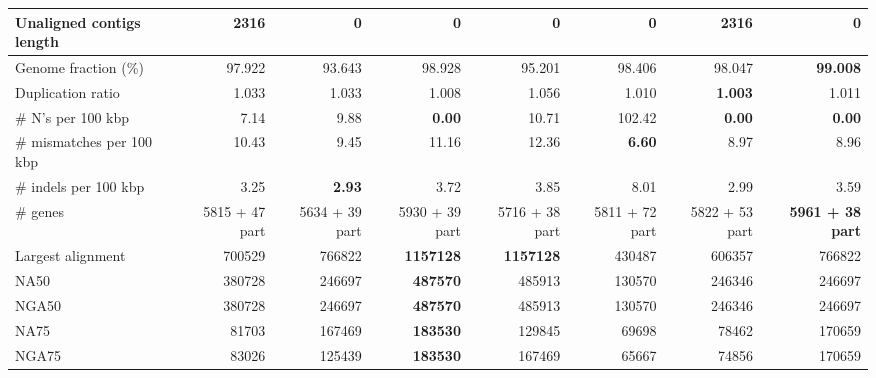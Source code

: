 \documentclass[12pt,a4paper]{article}
\begin{document}
\begin{table}[ht]
\begin{center}
\begin{tabular}{|l*{7}{|r}|}
Unaligned contigs length & 2316 & {\bf 0} & {\bf 0} & {\bf 0} & {\bf 0} & 2316 & {\bf 0} \\ \hline
Genome fraction (\%) & 97.922 & 93.643 & 98.928 & 95.201 & 98.406 & 98.047 & {\bf 99.008} \\ \hline
Duplication ratio & 1.033 & 1.033 & 1.008 & 1.056 & 1.010 & {\bf 1.003} & 1.011 \\ \hline
\# N's per 100 kbp & 7.14 & 9.88 & {\bf 0.00} & 10.71 & 102.42 & {\bf 0.00} & {\bf 0.00} \\ \hline
\# mismatches per 100 kbp & 10.43 & 9.45 & 11.16 & 12.36 & {\bf 6.60} & 8.97 & 8.96 \\ \hline
\# indels per 100 kbp & 3.25 & {\bf 2.93} & 3.72 & 3.85 & 8.01 & 2.99 & 3.59 \\ \hline
\# genes & 5815 + 47 part & 5634 + 39 part & 5930 + 39 part & 5716 + 38 part & 5811 + 72 part & 5822 + 53 part & {\bf 5961 + 38 part} \\ \hline
Largest alignment & 700529 & 766822 & {\bf 1157128} & {\bf 1157128} & 430487 & 606357 & 766822 \\ \hline
NA50 & 380728 & 246697 & {\bf 487570} & 485913 & 130570 & 246346 & 246697 \\ \hline
NGA50 & 380728 & 246697 & {\bf 487570} & 485913 & 130570 & 246346 & 246697 \\ \hline
NA75 & 81703 & 167469 & {\bf 183530} & 129845 & 69698 & 78462 & 170659 \\ \hline
NGA75 & 83026 & 125439 & {\bf 183530} & 167469 & 65667 & 74856 & 170659 \\ \hline
\end{tabular}
\end{center}
\end{table}
\end{document}
